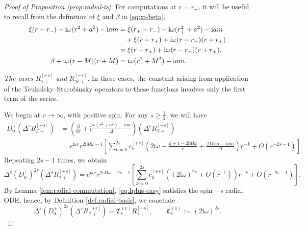 \documentclass[11pt]{article}
\newcommand{\dd}{\mathrm{d}}
\newcommand{\ii}{\mathrm{i}}
\newcommand{\cH}{\mathcal H}
\newcommand{\cI}{\mathcal I}
\numberwithin{equation}{section}
\begin{document}
\begin{proof}[Proof of Proposition \ref{prop:radial-ts}]
For computations at $r=r_+$, it will be useful to recall from the definition of $\xi$ and $\beta$ in \eqref{eq:xi-beta},
\begin{align}
\xi(r-r_-)+\ii\omega(r^2+a^2)-\ii am
&=\xi(r_+-r_-)+\ii\omega(r_+^2+a^2)-\ii am
\notag\\
&\quad+\xi(r-r_+)+\ii\omega(r-r_+)(r+r_+)
\notag\\
&=\xi(r-r_+)+\ii\omega(r-r_+)(r+r_+),
\label{eq:xi-identity}\\
\beta+\ii\omega(r-M)(r+M)&=\ii\omega(r^2+M^2)-\ii am.
\label{eq:beta-identity}
\end{align}

\emph{The cases $R^{[+s]}_{\cI+}$ and $R^{[-s]}_{\cH+}$.} In these cases, the constant arising from application of the Teukolsky--Starobinsky operators to these functions involves only the first term of the series.

We begin at $r\to\infty$, with positive spin. For any $s\geq\frac12$, we will have
\begin{align*}
D^+_0\left(\Delta^s R^{[+s]}_{\cI+}\right)
&=\left(\frac{\dd}{\dd r}+\ii\frac{\omega(r^2+a^2)-am}{\Delta}\right)
        \left(\Delta^sR^{[+s]}_{\cI+}\right)\\
&=e^{\ii\omega r}r^{2\ii M\omega-1}
\left[\sum_{k=0}^{2s}c^{[+s]}_k
\left(2\ii\omega-\frac{k+1-2\ii M\omega}{r}
      +\frac{2M\ii\omega r-\ii am}{\Delta}\right)r^{-k}
      +O(r^{-2s-1})\right].
\end{align*}
Repeating $2s-1$ times, we obtain
\begin{equation}\label{eq:Iplus-easy}
\Delta^s(D^+_0)^{2s}\left(\Delta^sR^{[+s]}_{\cI+}\right)
=e^{\ii\omega r}r^{2\ii M\omega+2s-1}
\left[\sum_{k=0}^{2s}c^{[+s]}_k\left((2\ii\omega)^{2s}+O(r^{-1})\right)r^{-k}+O(r^{-2s-1})\right].
\end{equation}
By Lemma \ref{lem:radial-commutation}, \eqref{eq:Iplus-easy} satisfies the spin $-s$ radial ODE, hence, by Definition \ref{def:radial-basis}, we conclude
\begin{equation*}
\Delta^s(D^+_0)^{2s}\left(\Delta^sR^{[+s]}_{\cI+}\right)=\mathfrak C^{(1)}_sR^{[-s]}_{\cI+},
\qquad
\mathfrak C^{(1)}_s:=(2\ii\omega)^{2s}.
\end{equation*}


\end{proof}
\end{document}
